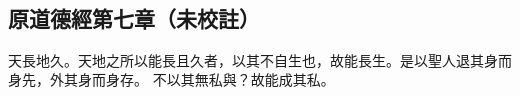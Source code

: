 ﻿%
%

\chapter{~}

\section{原道德經第七章（未校註）}

\begin{withgezhu}

\zhsong


天長地久。天地之所以能長且久者，以其不自生也，故能長生。是以聖人退其身而身先，外其身而身存。
不以其無私與？故能成其私。

\end{withgezhu}

